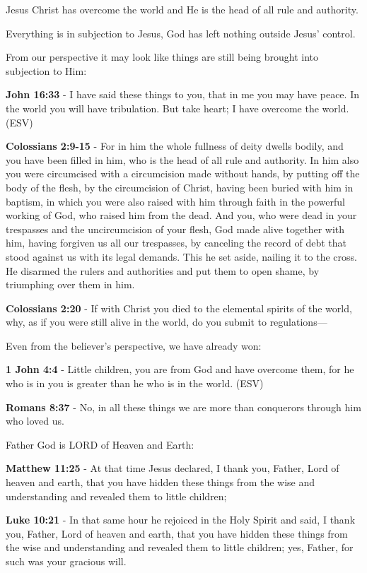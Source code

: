 \documentclass[11pt]{article}
\begin{document}
Jesus Christ has overcome the world and He is the head of all rule and authority.

Everything is in subjection to Jesus, God has left nothing outside Jesus' control.

From our perspective it may look like things are still being brought into subjection to Him:

\textbf{John 16:33} - I have said these things to you, that in me you may have peace.  In the world you will have tribulation.  But take heart; I have overcome the world.  (ESV)

\textbf{Colossians 2:9-15} - For in him the whole fullness of deity dwells bodily, and you have been filled in him, who is the head of all rule and authority. In him also you were circumcised with a circumcision made without hands, by putting off the body of the flesh, by the circumcision of Christ, having been buried with him in baptism, in which you were also raised with him through faith in the powerful working of God, who raised him from the dead. And you, who were dead in your trespasses and the uncircumcision of your flesh, God made alive together with him, having forgiven us all our trespasses, by canceling the record of debt that stood against us with its legal demands. This he set aside, nailing it to the cross. He disarmed the rulers and authorities and put them to open shame, by triumphing over them in him.

\textbf{Colossians 2:20} - If with Christ you died to the elemental spirits of the world, why, as if you were still alive in the world, do you submit to regulations—

Even from the believer's perspective, we have already won:

\textbf{1 John 4:4} -  Little children, you are from God and have overcome them, for he who is in you is greater than he who is in the world.  (ESV)

\textbf{Romans 8:37} - No, in all these things we are more than conquerors through him who loved us.

Father God is LORD of Heaven and Earth:

\textbf{Matthew 11:25} - At that time Jesus declared, I thank you, Father, Lord of heaven and earth, that you have hidden these things from the wise and understanding and revealed them to little children;

\textbf{Luke 10:21} - In that same hour he rejoiced in the Holy Spirit and said, I thank you, Father, Lord of heaven and earth, that you have hidden these things from the wise and understanding and revealed them to little children; yes, Father, for such was your gracious will.
\end{document}
